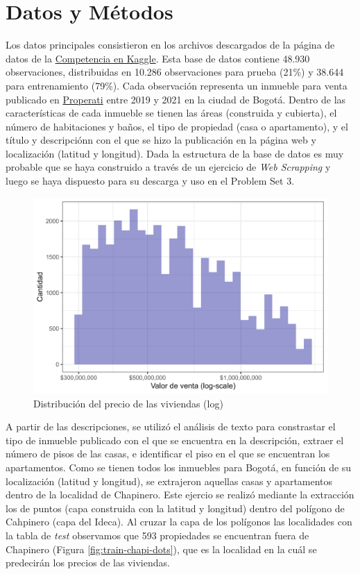 \documentclass[
  11pt,
  letterpaper,
]{article}
\begin{document}
\hypertarget{datos-y-muxe9todos}{%
\section{Datos y Métodos}\label{datos-y-muxe9todos}}

Los datos principales consistieron en los archivos descargados de la página de datos de la \href{https://www.kaggle.com/competitions/uniandes-bdml-202410-ps3}{Competencia en Kaggle}. Esta base de datos contiene 48.930 observaciones, distribuidas en 10.286 observaciones para prueba (21\%) y 38.644 para entrenamiento (79\%). Cada observación representa un inmueble para venta publicado en \href{ https://www.properati.com.co/}{Properati} entre 2019 y 2021 en la ciudad de Bogotá. Dentro de las características de cada inmueble se tienen las áreas (construida y cubierta), el número de habitaciones y baños, el tipo de propiedad (casa o apartamento), y el título y descripciónn con el que se hizo la publicación en la página web y localización (latitud y longitud). Dada la estructura de la base de datos es muy probable que se haya construido a través de un ejercicio de \textit{Web Scrapping} y luego se haya dispuesto para su descarga y uso en el Problem Set 3.

\begin{figure}[H]
\includegraphics[width=0.7\linewidth]{../views/g1} \caption{Distribución del precio de las viviendas (log)}\label{fig:grap00}
\end{figure}

A partir de las descripciones, se utilizó el análisis de texto para constrastar el tipo de inmueble publicado con el que se encuentra en la descripción, extraer el número de pisos de las casas, e identificar el piso en el que se encuentran los apartamentos. Como se tienen todos los inmuebles para Bogotá, en función de su localización (latitud y longitud), se extrajeron aquellas casas y apartamentos dentro de la localidad de Chapinero. Este ejercio se realizó mediante la extracción los de puntos (capa construida con la latitud y longitud) dentro del polígono de Cahpinero (capa del Ideca). Al cruzar la capa de los polígonos las localidades con la tabla de \emph{test} observamos que 593 propiedades se encuentran fuera de Chapinero (Figura \ref{fig:train-chapi-dots}), que es la localidad en la cuál se predecirán los precios de las viviendas.
\end{document}
